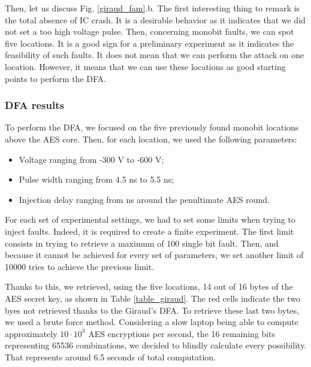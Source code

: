 			Then, let us discuss Fig. \ref{giraud_fam}.b.
			The first interesting thing to remark is the total absence of IC crash.
			It is a desirable behavior as it indicates that we did not set a too high voltage pulse.
			Then, concerning monobit faults, we can spot five locations.
			It is a good sign for a preliminary experiment as it indicates the feasibility of such faults.
			It does not mean that we can perform the attack on one location.
			However, it means that we can use these locations as good starting points to perform the DFA.
			
		\subsubsection{DFA results}
			To perform the DFA, we focused on the five previously found monobit locations above the AES core.
			Then, for each location, we used the following parameters:
			\begin{itemize}
				\item Voltage ranging from -300 V to -600 V;
				\item Pulse width ranging from 4.5 ns to 5.5 ns;
				\item Injection delay ranging from  ns around the penultimate AES round.
			\end{itemize}
			For each set of experimental settings, we had to set some limits when trying to inject faults.
			Indeed, it is required to create a finite experiment.
			The first limit consists in trying to retrieve a maximum of 100 single bit fault.
			Then, and because it cannot be achieved for every set of parameters, we set another limit of 10000 tries to achieve the previous limit.
			
			Thanks to this, we retrieved, using the five locations, 14 out of 16 bytes of the AES secret key, as shown in Table \ref{table_giraud}.
			The red cells indicate the two byes not retrieved thanks to the Giraud's DFA.
			To retrieve these last two bytes, we used a brute force method.
			Considering a slow laptop being able to compute approximately $10 \cdot 10^3$ AES encryptions per second, the 16 remaining bits representing 65536 combinations, we decided to blindly calculate every possibility.
			That represents around 6.5 seconds of total computation.
	
